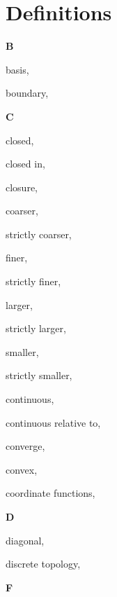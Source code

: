 \section*{Definitions}

\begin{multicols}{2}

\vspace{1em}\noindent\large{\textbf{B}}

basis, \pageref{def:Basis}

boundary, \pageref{def:Boundary}

\vspace{1em}\noindent\large{\textbf{C}}

closed, \pageref{def:Closed}

\hspace{1em}closed in, \pageref{def:ClosedIn}

closure, \pageref{def:Closure}

coarser, \pageref{def:Comparable}

\hspace{1em}strictly coarser, \pageref{def:Comparable}

finer, \pageref{def:Comparable}

\hspace{1em}strictly finer, \pageref{def:Comparable}

larger, \pageref{def:Comparable}

\hspace{1em}strictly larger, \pageref{def:Comparable}

smaller, \pageref{def:Comparable}

\hspace{1em}strictly smaller, \pageref{def:Comparable}

continuous, \pageref{def:Continuous}

\hspace{1em}continuous relative to, \pageref{def:ContinuousRelativeTo}

converge, \pageref{def:Converge}

convex, \pageref{def:Convex}

coordinate functions, \pageref{def:CoordinateFunctions}

\vspace{1em}\noindent\large{\textbf{D}}

diagonal, \pageref{def:Diagonal}

discrete topology, \pageref{def:DiscreteTopology}

\vspace{1em}\noindent\large{\textbf{F}}


\end{multicols}
